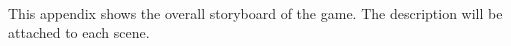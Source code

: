 \documentclass[12pt,oneside,openright,a4paper]{cpe-english-project}
\begin{document}
%
%
%
%


\nocite{*}

\makeatletter
\g@addto@macro{\UrlBreaks}{\UrlOrds}
\makeatother






 \\
This appendix shows the overall storyboard of the game. The description will be attached to each scene.
\end{document}

